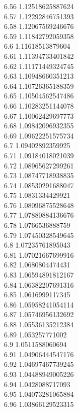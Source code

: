 {6.56	1.12518625887624\\
6.57	1.12292846751393\\
6.58	1.12067569246676\\
6.59	1.11842792059358\\
6.6	1.11618513879604\\
6.61	1.11394733401842\\
6.62	1.11171449324745\\
6.63	1.10948660351213\\
6.64	1.10726365188359\\
6.65	1.10504562547486\\
6.66	1.10283251144078\\
6.67	1.10062429697773\\
6.68	1.09842096932355\\
6.69	1.09622251575734\\
6.7	1.09402892359925\\
6.71	1.09184018021039\\
6.72	1.08965627299261\\
6.73	1.08747718938835\\
6.74	1.08530291688047\\
6.75	1.0831334429921\\
6.76	1.08096875528648\\
6.77	1.07880884136676\\
6.78	1.0766536888759\\
6.79	1.07450328549645\\
6.8	1.07235761895043\\
6.81	1.07021667699916\\
6.82	1.0680804474431\\
6.83	1.06594891812167\\
6.84	1.06382207691316\\
6.85	1.0616999117345\\
6.86	1.05958241054114\\
6.87	1.05746956132692\\
6.88	1.05536135212384\\
6.89	1.053257771002\\
6.9	1.0511588060694\\
6.91	1.04906444547176\\
6.92	1.04697467739245\\
6.93	1.04488949005226\\
6.94	1.0428088717093\\
6.95	1.04073281065884\\
6.96	1.03866129523315\\
}
